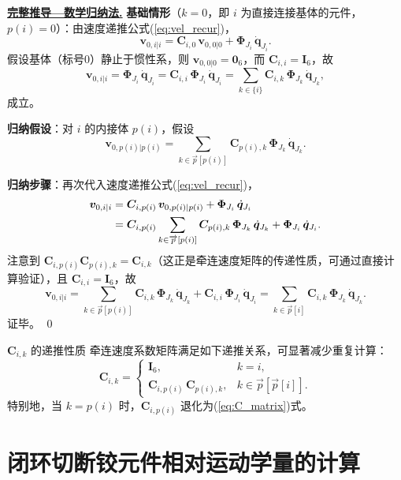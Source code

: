\documentclass[10pt,a4paper]{book}
\theoremstyle{thmstyle}
\theoremstyle{defstyle}
\theoremstyle{prostyle}
\renewenvironment{proof}[1][证明]{\par{\kaishu \underline{\textbf{#1.}}} \;\fangsong}{\qed\par}
\renewcommand{\vec}[1]{\bm{#1}}
\newcommand{\mat}[1]{\bm{#1}}
\begin{document}
\begin{proof}[完整推导---数学归纳法]
\textbf{基础情形}（$k = 0$，即 $i$ 为直接连接基体的元件，$p(i)=0$）：由速度递推公式(\ref{eq:vel_recur})，
\[
\vec{v}_{0,i|i} = \mat{C}_{i,0}\,\vec{v}_{0,0|0} + \mat{\Phi}_{J_i}\,\dot{\vec{q}}_{J_i}.
\]
假设基体（标号0）静止于惯性系，则 $\vec{v}_{0,0|0} = \vec{0}_6$，而 $\mat{C}_{i,i} = \mat{I}_6$，故
\[
\vec{v}_{0,i|i} = \mat{\Phi}_{J_i}\,\dot{\vec{q}}_{J_i}
= \mat{C}_{i,i}\,\mat{\Phi}_{J_i}\,\dot{\vec{q}}_{J_i}
= \sum_{k\in\{i\}} \mat{C}_{i,k}\,\mat{\Phi}_{J_k}\,\dot{\vec{q}}_{J_k},
\]
成立。

\textbf{归纳假设}：对 $i$ 的内接体 $p(i)$，假设
\[
\vec{v}_{0,p(i)|p(i)} = \sum_{k\in\overrightarrow{p}[p(i)]} \mat{C}_{p(i),k}\,\mat{\Phi}_{J_k}\,\dot{\vec{q}}_{J_k}.
\]

\textbf{归纳步骤}：再次代入速度递推公式(\ref{eq:vel_recur})，
\begin{align}
\vec{v}_{0,i|i}
&= \mat{C}_{i,p(i)}\,\vec{v}_{0,p(i)|p(i)} + \mat{\Phi}_{J_i}\,\dot{\vec{q}}_{J_i} \notag\\
&= \mat{C}_{i,p(i)}
\sum_{k\in\overrightarrow{p}[p(i)]} \mat{C}_{p(i),k}\,\mat{\Phi}_{J_k}\,\dot{\vec{q}}_{J_k}
+ \mat{\Phi}_{J_i}\,\dot{\vec{q}}_{J_i}.
\end{align}
注意到 $\mat{C}_{i,p(i)}\mat{C}_{p(i),k} = \mat{C}_{i,k}$（这正是牵连速度矩阵的传递性质，可通过直接计算验证），且 $\mat{C}_{i,i} = \mat{I}_6$，故
\[
\vec{v}_{0,i|i} = \sum_{k\in\overrightarrow{p}[p(i)]} \mat{C}_{i,k}\,\mat{\Phi}_{J_k}\,\dot{\vec{q}}_{J_k}
+ \mat{C}_{i,i}\,\mat{\Phi}_{J_i}\,\dot{\vec{q}}_{J_i}
= \sum_{k\in\overrightarrow{p}[i]} \mat{C}_{i,k}\,\mat{\Phi}_{J_k}\,\dot{\vec{q}}_{J_k}.
\]
证毕。
\end{proof}

\begin{myTheorem}{$\mat{C}_{i,k}$ 的递推性质}
牵连速度系数矩阵满足如下递推关系，可显著减少重复计算：
\begin{equation}
\mat{C}_{i,k} =
\begin{cases}
\mat{I}_6, & k = i,\\[4pt]
\mat{C}_{i,p(i)}\,\mat{C}_{p(i),k}, & k \in \overrightarrow{p}[\overrightarrow{p}[i]].
\end{cases}
\label{eq:C_recur}
\end{equation}
特别地，当 $k = p(i)$ 时，$\mat{C}_{i,p(i)}$ 退化为(\ref{eq:C_matrix})式。
\end{myTheorem}


\section{闭环切断铰元件相对运动学量的计算}
\end{document}
